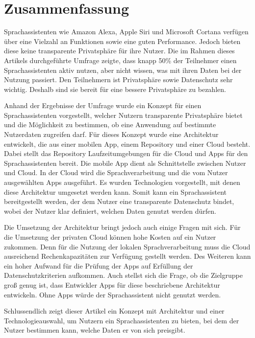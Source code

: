 \section{Zusammenfassung}
Sprachassistenten wie Amazon Alexa, Apple Siri und Microsoft Cortana verfügen über eine Vielzahl an Funktionen sowie eine guten Performance. Jedoch bieten diese keine transparente Privatsphäre für ihre Nutzer. Die im Rahmen dieses Artikels durchgeführte Umfrage zeigte, dass knapp 50\% der Teilnehmer einen Sprachassistenten aktiv nutzen, aber nicht wissen, was mit ihren Daten bei der Nutzung passiert. Den Teilnehmern ist Privatsphäre sowie Datenschutz sehr wichtig. Deshalb sind sie bereit für eine bessere Privatsphäre zu bezahlen. 

Anhand der Ergebnisse der Umfrage wurde ein Konzept für einen Sprachassistenten vorgestellt, welcher Nutzern transparente Privatsphäre bietet und die Möglichkeit zu bestimmen, ob eine Anwendung auf bestimmte Nutzerdaten zugreifen darf. Für dieses Konzept wurde eine Architektur entwickelt, die aus einer mobilen App, einem Repository und einer Cloud besteht. Dabei stellt das Repository Laufzeitumgebungen für die Cloud und Apps für den Sprachassistenten bereit. Die mobile App dient als Schnittstelle zwischen Nutzer und Cloud. In der Cloud wird die Sprachverarbeitung und die vom Nutzer ausgewählten Apps ausgeführt. Es wurden Technologien vorgestellt, mit denen diese Architektur umgesetzt werden kann. Somit kann ein Sprachassistent bereitgestellt werden, der dem Nutzer eine transparente Datenschutz bindet, wobei der Nutzer klar definiert, welchen Daten genutzt werden dürfen. 

Die Umsetzung der Architektur bringt jedoch auch einige Fragen mit sich. Für die Umsetzung der privaten Cloud können hohe Kosten auf ein Nutzer zukommen. Denn für die Nutzung der lokalen Sprachverarbeitung muss die Cloud ausreichend Rechenkapazitäten zur Verfügung gestellt werden. Des Weiteren kann ein hoher Aufwand für die Prüfung der Apps auf Erfüllung der Datenschutzkriterien aufkommen. Auch stellst sich die Frage, ob die Zielgruppe groß genug ist, dass Entwickler Apps für diese beschriebene Architektur entwickeln. Ohne Apps würde der Sprachassistent nicht genutzt werden.

Schlussendlich zeigt dieser Artikel ein Konzept mit Architektur und einer Technologieauswahl, um Nutzern ein Sprachassistenten zu bieten, bei dem der Nutzer bestimmen kann, welche Daten er von sich preisgibt. 